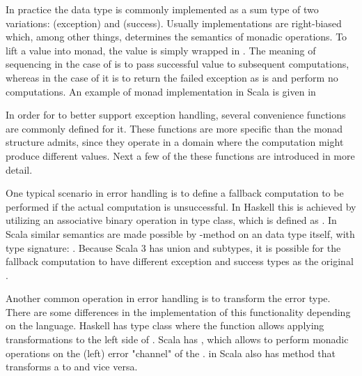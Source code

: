 In practice the  data type is commonly implemented as a sum type of two variations:  (exception) and  (success). Usually implementations are right-biased which, among other things, determines the semantics of monadic operations. To lift a value into  monad, the value is simply wrapped in . The meaning of sequencing in the case of  is to pass successful value to subsequent computations, whereas in the case of  it is to return the failed exception as is and perform no computations. An example of  monad implementation in Scala is given in 



In order for  to better support exception handling, several convenience functions are commonly defined for it. These functions are more specific than the monad structure admits, since they operate in a domain where the computation might produce different values. Next a few of the these functions are introduced in more detail.

One typical scenario in error handling is to define a fallback computation to be performed if the actual computation is unsuccessful. In Haskell this is achieved by utilizing an associative binary operation in  type class, which is defined as . In Scala similar semantics are made possible by  -method on an  data type itself, with type signature: . Because Scala 3 has union and subtypes, it is possible for the fallback computation to have different exception and success types as the original .

Another common operation in error handling is to transform the error type. There are some differences in the implementation of this functionality depending on the language. Haskell has  type class where the function  allows applying transformations to the left side of . Scala has , which allows to perform monadic operations on the (left) error "channel" of the .  in Scala also has  method that transforms a  to  and vice versa.

